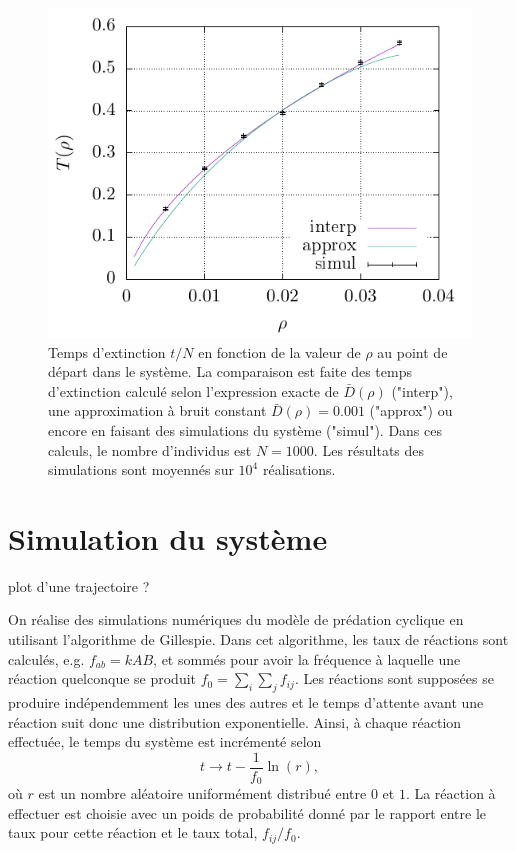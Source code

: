 \documentclass[openany,a4paper,12pt]{article}
\begin{document}
\begin{figure}[t]
	\centering
	\includegraphics[width=0.9\linewidth]{figures/extc_time_comparison}
	\caption{Temps d'extinction $t/N$ en fonction de la valeur de $\rho$ au point de départ dans le système. La comparaison est faite des temps d'extinction calculé selon l'expression exacte de $\bar D(\rho)$ ("interp"), une approximation à bruit constant $\bar D(\rho)=0.001$ ("approx") ou encore en faisant des simulations du système ("simul"). Dans ces calculs, le nombre d'individus est $N=1000$. Les résultats des simulations sont moyennés sur $10^4$ réalisations.}
	\label{fig:T_extc}
\end{figure}


\section{Simulation du système}
\label{section_simulation}

{\color{red} plot d'une trajectoire ?}

\par On réalise des simulations numériques du modèle de prédation cyclique en utilisant l'algorithme de Gillespie. Dans cet algorithme, les taux de réactions sont calculés, e.g. $f_{ab} = k AB$, et sommés pour avoir la fréquence à laquelle une réaction quelconque se produit $f_0 = \sum_i\sum_j f_{ij}$. Les réactions sont supposées se produire indépendemment les unes des autres et le temps d'attente avant une réaction suit donc une distribution exponentielle. Ainsi, à chaque réaction effectuée, le temps du système est incrémenté selon
%
\begin{equation}\label{gillespie_incr_temps}
	t \rightarrow t - \frac{1}{f_0} \ln(r),
\end{equation}
%
où $r$ est un nombre aléatoire uniformément distribué entre $0$ et $1$.
La réaction à effectuer est choisie avec un poids de probabilité donné par le rapport entre le taux pour cette réaction et le taux total, $f_{ij}/f_0$.
\end{document}
